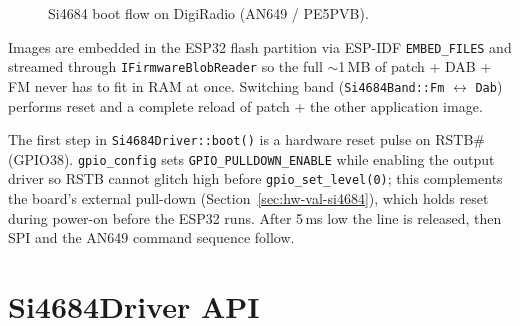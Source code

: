 \begin{figure}[htbp]
  \centering
  \caption{Si4684 boot flow on DigiRadio (AN649 / PE5PVB).}
  \label{fig:si4684-boot}
\end{figure}

Images are embedded in the ESP32 flash partition via ESP-IDF
\texttt{EMBED\_FILES} and streamed through \texttt{IFirmwareBlobReader} so the
full $\sim$1\,MB of patch + DAB + FM never has to fit in RAM at once. Switching
band (\texttt{Si4684Band::Fm} $\leftrightarrow$ \texttt{Dab}) performs reset and
a complete reload of patch + the other application image.

\begin{drnote}
The first step in \texttt{Si4684Driver::boot()} is a hardware reset pulse on
RSTB\# (GPIO38). \texttt{gpio\_config} sets \texttt{GPIO\_PULLDOWN\_ENABLE}
while enabling the output driver so RSTB cannot glitch high before
\texttt{gpio\_set\_level(0)}; this complements the board's external pull-down
(Section~\ref{sec:hw-val-si4684}), which holds reset during power-on before the
ESP32 runs. After 5\,ms low the line is released, then SPI and the AN649
command sequence follow.
\end{drnote}

\section{Si4684Driver API}
\label{sec:si4684-driver}

